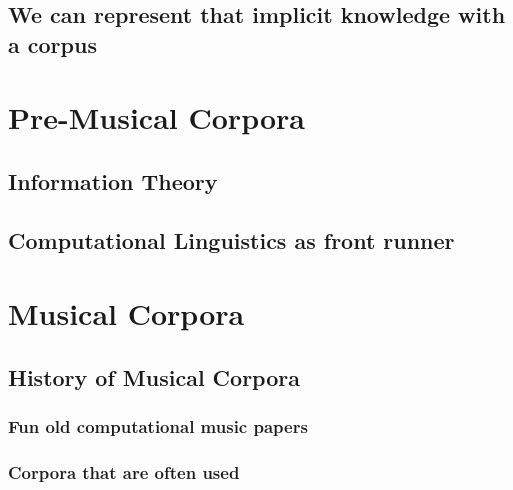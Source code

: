 \documentclass[]{book}
\theoremstyle{definition}
\theoremstyle{definition}
\theoremstyle{definition}
\theoremstyle{remark}
\begin{document}
\hypertarget{we-can-represent-that-implicit-knowledge-with-a-corpus}{%
\subsection{We can represent that implicit knowledge with a
corpus}\label{we-can-represent-that-implicit-knowledge-with-a-corpus}}

\hypertarget{pre-musical-corpora}{%
\section{Pre-Musical Corpora}\label{pre-musical-corpora}}

\hypertarget{information-theory}{%
\subsection{Information Theory}\label{information-theory}}

\hypertarget{computational-linguistics-as-front-runner}{%
\subsection{Computational Linguistics as front
runner}\label{computational-linguistics-as-front-runner}}

\hypertarget{musical-corpora}{%
\section{Musical Corpora}\label{musical-corpora}}

\hypertarget{history-of-musical-corpora}{%
\subsection{History of Musical
Corpora}\label{history-of-musical-corpora}}

\hypertarget{fun-old-computational-music-papers}{%
\subsubsection{Fun old computational music
papers}\label{fun-old-computational-music-papers}}

\hypertarget{corpora-that-are-often-used}{%
\subsubsection{Corpora that are often
used}\label{corpora-that-are-often-used}}
\end{document}
